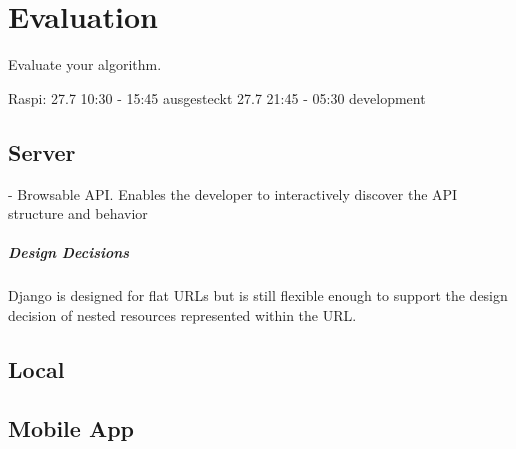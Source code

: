 \chapter{Evaluation}
\label{sec:evaluation}

Evaluate your algorithm.

Raspi: 27.7 10:30 - 15:45 ausgesteckt
27.7 21:45 - 05:30 development

\section{Server}

- Browsable API. Enables the developer to interactively discover the API structure and behavior

\paragraph{Design Decisions}

Django is designed for flat URLs but is still flexible enough to support the design decision of nested resources represented within the URL.

\section{Local}


\section{Mobile App}
